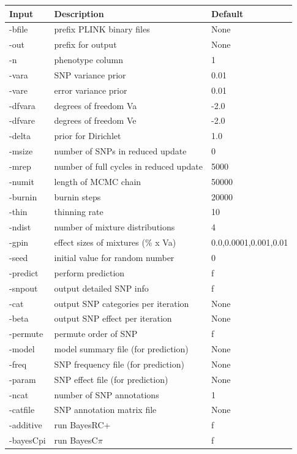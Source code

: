 \documentclass{ol-softwaremanual}
\begin{document}
\begin{table}[h!]
    \centering
    \begin{tabular}{|l|l|l|}
    \hline
      \textbf{Input} & \textbf{Description} &\textbf{Default} \\ 
      \hline
      \hline
-bfile & prefix PLINK binary files & None \\
-out &prefix for output& None \\
-n&phenotype column& 1 \\
-vara&SNP variance prior&0.01\\
-vare&error variance prior&0.01\\
-dfvara&degrees of freedom Va &-2.0\\
-dfvare&degrees of freedom Ve&-2.0\\
-delta&prior for Dirichlet&1.0\\
-msize&number of SNPs in reduced update&0\\
-mrep&number of full cycles in reduced update&5000\\
-numit&length of MCMC chain&50000\\
-burnin&burnin steps&20000\\
-thin&thinning rate&10\\
-ndist&number of mixture distributions&4\\
-gpin&effect sizes of mixtures (\% x Va)& 0.0,0.0001,0.001,0.01\\
-seed&initial value for random number&0\\
-predict&perform prediction&f\\
-snpout&output detailed SNP info&f\\
-cat&output SNP categories per iteration & None\\
-beta&output SNP effect per iteration&None\\
-permute&permute order of SNP&f\\
-model&model summary file (for prediction) & None\\
-freq&SNP frequency file (for prediction)&None\\
-param&SNP effect file (for prediction) & None\\
-ncat&number of SNP annotations&1\\
-catfile&SNP annotation matrix file& None\\
-additive&run BayesRC+&f\\
-bayesCpi&run BayesC$\pi$&f\\
\hline
    \end{tabular}
\end{table}
\end{document}
